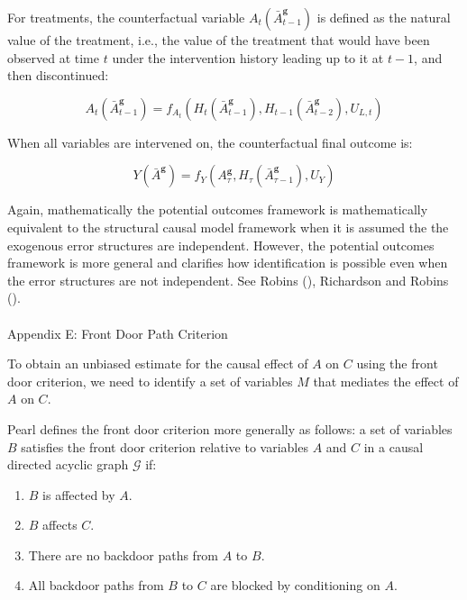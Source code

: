 \documentclass[
  single column]{article}
\makeatletter
\let\oldparagraph\paragraph
\renewcommand{\paragraph}{
    \@ifstar
      \xxxParagraphStar
      \xxxParagraphNoStar
  }
\newcommand{\xxxParagraphStar}[1]{\oldparagraph*{#1}\mbox{}}
\newcommand{\xxxParagraphNoStar}[1]{\oldparagraph{#1}\mbox{}}
\providecommand{\tightlist}{%
  \setlength{\itemsep}{0pt}\setlength{\parskip}{0pt}}\usepackage{longtable,booktabs,array}
\makeatother
\begin{document}
For treatments, the counterfactual variable
\(A_t(\bar{A}^\mathbf{g}_{t-1})\) is defined as the natural value of the
treatment, i.e., the value of the treatment that would have been
observed at time \(t\) under the intervention history leading up to it
at \(t-1\), and then discontinued:

\[
A_t(\bar{A}^\mathbf{g}_{t-1}) = f_{A_t}(H_t(\bar{A}^\mathbf{g}_{t-1}), H_{t-1}(\bar{A}^\mathbf{g}_{t-2}), U_{L,t})
\]

When all variables are intervened on, the counterfactual final outcome
is:

\[
Y(\bar{A}^\mathbf{g}) = f_Y(A^\mathbf{g}_\tau, H_\tau(\bar{A}^\mathbf{g}_{\tau-1}), U_{Y})
\]

Again, mathematically the potential outcomes framework is mathematically
equivalent to the structural causal model framework when it is assumed
the the exogenous error structures are independent. However, the
potential outcomes framework is more general and clarifies how
identification is possible even when the error structures are not
independent. See Robins (), Richardson
and Robins ().

\newpage{}

\paragraph{Appendix E: Front Door Path Criterion}\label{id-app-e}

To obtain an unbiased estimate for the causal effect of \(A\) on \(C\)
using the front door criterion, we need to identify a set of variables
\(M\) that mediates the effect of \(A\) on \(C\).

Pearl defines the front door criterion more generally as follows: a set
of variables \(B\) satisfies the front door criterion relative to
variables \(A\) and \(C\) in a causal directed acyclic graph
\(\mathcal{G}\) if:

\begin{enumerate}
\def\labelenumi{\arabic{enumi}.}
\tightlist
\item
  \(B\) is affected by \(A\).
\item
  \(B\) affects \(C\).
\item
  There are no backdoor paths from \(A\) to \(B\).
\item
  All backdoor paths from \(B\) to \(C\) are blocked by conditioning on
  \(A\).
\end{enumerate}
\end{document}

